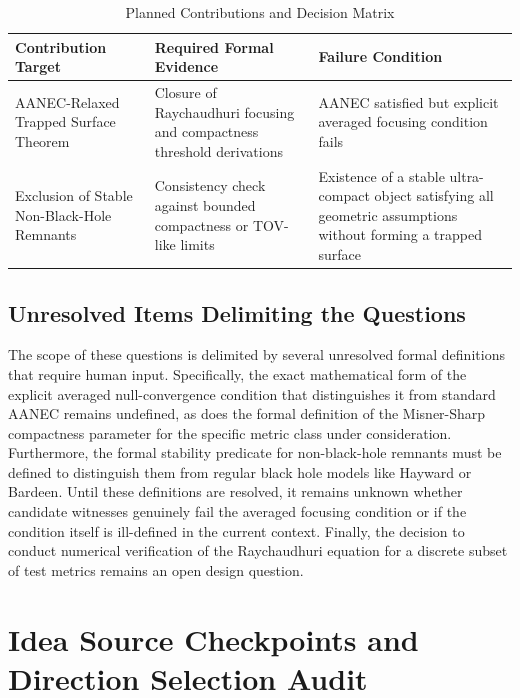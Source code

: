 \documentclass[conference]{IEEEtran}
\begin{document}
\begin{table}[htbp]
\centering
\footnotesize
\setlength{\tabcolsep}{3pt}
\renewcommand{\arraystretch}{1.12}
\caption{Planned Contributions and Decision Matrix}
\label{tab:research-questions-and-contributions-rq-contrib-2}
\begin{tabular}{|p{}|p{}|p{}|}
\hline
Contribution Target & Required Formal Evidence & Failure Condition \\\hline
AANEC-Relaxed Trapped Surface Theorem & Closure of Raychaudhuri focusing and compactness threshold derivations & AANEC satisfied but explicit averaged focusing condition fails \\\hline
Exclusion of Stable Non-Black-Hole Remnants & Consistency check against bounded compactness or TOV-like limits & Existence of a stable ultra-compact object satisfying all geometric assumptions without forming a trapped surface \\\hline
\end{tabular}
\end{table}

\subsection{Unresolved Items Delimiting the Questions}
The scope of these questions is delimited by several unresolved formal definitions that require human input. Specifically, the exact mathematical form of the explicit averaged null-convergence condition that distinguishes it from standard AANEC remains undefined, as does the formal definition of the Misner-Sharp compactness parameter for the specific metric class under consideration. Furthermore, the formal stability predicate for non-black-hole remnants must be defined to distinguish them from regular black hole models like Hayward or Bardeen. Until these definitions are resolved, it remains unknown whether candidate witnesses genuinely fail the averaged focusing condition or if the condition itself is ill-defined in the current context. Finally, the decision to conduct numerical verification of the Raychaudhuri equation for a discrete subset of test metrics remains an open design question.

\section{Idea Source Checkpoints and Direction Selection Audit}
\end{document}
